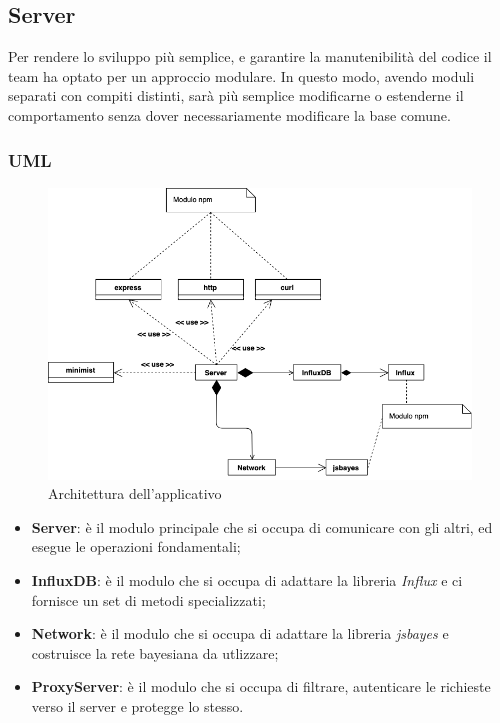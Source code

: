 \subsection{Server}\label{archServer}
Per rendere lo sviluppo più semplice, e garantire la manutenibilità del codice il team ha optato per un approccio modulare. In questo modo, avendo moduli separati con compiti distinti, sarà più semplice modificarne o estenderne il comportamento senza dover necessariamente modificare la base comune.\\

\subsubsection{UML}
\begin{figure}[H]
	\begin{center}
		\includegraphics[scale=0.5]{./images/server_class_non_espanso.png} 
	\end{center}
	\caption{Architettura dell'applicativo}
\end{figure}

\begin{itemize}
 \item \textbf{Server}: è il modulo principale che si occupa di comunicare con gli altri, ed esegue le operazioni fondamentali;
 \item \textbf{InfluxDB}: è il modulo che si occupa di adattare la libreria \textit{Influx} e ci fornisce un set di metodi specializzati;
 \item \textbf{Network}: è il modulo che si occupa di adattare la libreria \textit{jsbayes} e costruisce la rete bayesiana da utlizzare;
 \item \textbf{ProxyServer}: è il modulo che si occupa di filtrare, autenticare le richieste verso il server e  protegge lo stesso.
\end{itemize}

